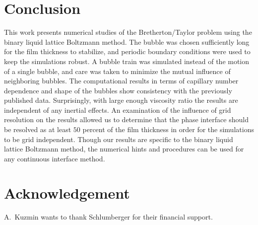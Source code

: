 \documentclass[preprint,12pt]{elsarticle}
\begin{document}
\section{Conclusion}
This work presents numerical studies of the
Bretherton/Taylor problem using the binary liquid lattice Boltzmann method. The bubble was chosen sufficiently long for the film
thickness to
stabilize, and periodic boundary conditions were used to keep the simulations robust.  A bubble
train was simulated instead of the motion of a single bubble, and care was taken to minimize
the mutual influence of neighboring bubbles. The computational
results in terms of capillary number dependence and shape of the bubbles show consistency with the
previously published data. Surprisingly, with large enough viscosity ratio the results are
independent of any inertial effects.  An examination of the influence of grid resolution on the results allowed
us to determine that the phase interface should be resolved as at least $50$ percent of the film thickness
in order for the simulations to be grid independent. Though our results are specific to the binary liquid lattice
Boltzmann method, the numerical hints and procedures can be used for any
continuous interface method.
\section{Acknowledgement}
A.~Kuzmin wants to thank Schlumberger for their financial support.


%
%
\end{document}

